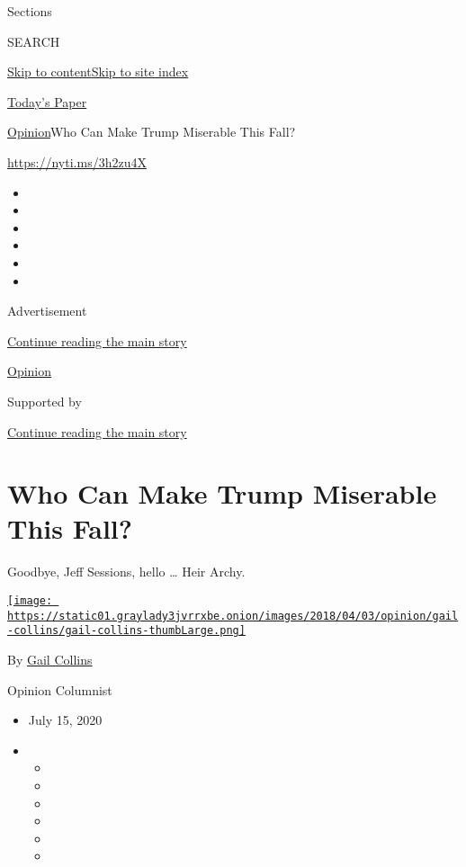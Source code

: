 Sections

SEARCH

\protect\hyperlink{site-content}{Skip to
content}\protect\hyperlink{site-index}{Skip to site index}

\href{https://myaccount.nytimes3xbfgragh.onion/auth/login?response_type=cookie\&client_id=vi}{}

\href{https://www.nytimes3xbfgragh.onion/section/todayspaper}{Today's
Paper}

\href{/section/opinion}{Opinion}\textbar{}Who Can Make Trump Miserable
This Fall?

\href{https://nyti.ms/3h2zu4X}{https://nyti.ms/3h2zu4X}

\begin{itemize}
\item
\item
\item
\item
\item
\item
\end{itemize}

Advertisement

\protect\hyperlink{after-top}{Continue reading the main story}

\href{/section/opinion}{Opinion}

Supported by

\protect\hyperlink{after-sponsor}{Continue reading the main story}

\hypertarget{who-can-make-trump-miserable-this-fall}{%
\section{Who Can Make Trump Miserable This
Fall?}\label{who-can-make-trump-miserable-this-fall}}

Goodbye, Jeff Sessions, hello \ldots{} Heir Archy.

\href{https://www.nytimes3xbfgragh.onion/by/gail-collins}{\texttt{[image: https://static01.graylady3jvrrxbe.onion/images/2018/04/03/opinion/gail-collins/gail-collins-thumbLarge.png]}}

By \href{https://www.nytimes3xbfgragh.onion/by/gail-collins}{Gail
Collins}

Opinion Columnist

\begin{itemize}
\item
  July 15, 2020
\item
  \begin{itemize}
  \item
  \item
  \item
  \item
  \item
  \item
  \end{itemize}
\end{itemize}

